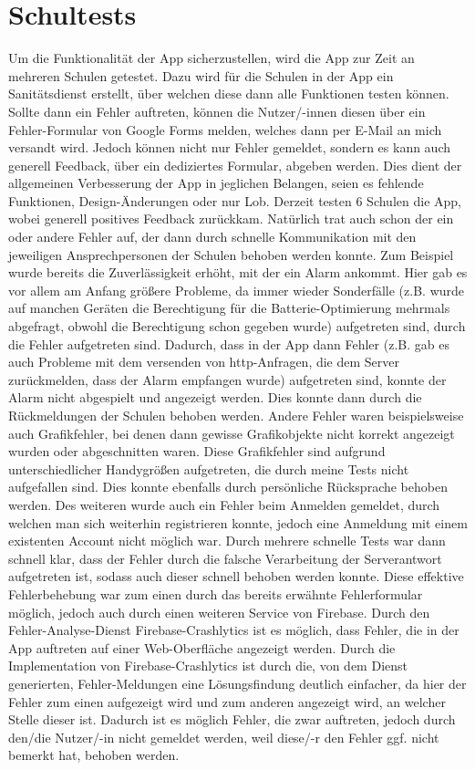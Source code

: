 \section{Schultests}
Um die Funktionalität der App sicherzustellen, wird die App zur Zeit an 
mehreren Schulen getestet. Dazu wird für die Schulen in der App ein Sanitätsdienst erstellt,
über welchen diese dann alle Funktionen testen können. Sollte dann ein Fehler
auftreten, können die Nutzer/-innen diesen über ein Fehler-Formular von Google Forms 
melden, welches dann per E-Mail an mich versandt wird. 
Jedoch können nicht nur Fehler gemeldet, sondern es kann auch generell Feedback, über ein
dediziertes Formular, abgeben werden. Dies dient der allgemeinen Verbesserung
der App in jeglichen Belangen, seien es fehlende Funktionen, Design-Änderungen
oder nur Lob. Derzeit testen 6 Schulen die App, wobei generell positives
Feedback zurückkam. Natürlich trat auch schon der ein oder andere Fehler 
auf, der dann durch schnelle Kommunikation mit den jeweiligen 
Ansprechpersonen der Schulen behoben werden konnte.
Zum Beispiel wurde bereits die Zuverlässigkeit erhöht, mit der ein Alarm 
ankommt. Hier gab es vor allem am Anfang größere Probleme, da immer wieder 
Sonderfälle (z.B. wurde auf manchen Geräten die Berechtigung für die Batterie-Optimierung
mehrmals abgefragt, obwohl die Berechtigung schon gegeben wurde) aufgetreten sind, durch 
die Fehler aufgetreten sind. Dadurch, dass in der App dann Fehler (z.B. gab es auch Probleme
mit dem versenden von http-Anfragen, die dem Server zurückmelden, dass der Alarm empfangen wurde) 
aufgetreten sind, konnte der Alarm nicht abgespielt und angezeigt werden. Dies konnte dann 
durch die Rückmeldungen der Schulen behoben werden. Andere Fehler waren beispielsweise 
auch Grafikfehler, bei denen dann gewisse Grafikobjekte nicht korrekt angezeigt wurden 
oder abgeschnitten waren. Diese Grafikfehler sind aufgrund unterschiedlicher Handygrößen aufgetreten,
die durch meine Tests nicht aufgefallen sind. Dies konnte ebenfalls durch persönliche Rücksprache behoben werden.
Des weiteren wurde auch ein Fehler beim Anmelden gemeldet, durch welchen
man sich weiterhin registrieren konnte, jedoch eine Anmeldung mit einem 
existenten Account nicht möglich war.
Durch mehrere schnelle Tests war dann schnell klar, dass der Fehler durch die 
falsche Verarbeitung der Serverantwort aufgetreten ist, sodass auch dieser 
schnell behoben werden konnte. 
Diese effektive Fehlerbehebung war zum einen durch das bereits erwähnte 
Fehlerformular möglich, jedoch auch durch einen weiteren Service von Firebase.
Durch den Fehler-Analyse-Dienst \glqq Firebase-Crashlytics\grqq{} ist es möglich, dass Fehler, die in der App 
auftreten auf einer Web-Oberfläche angezeigt werden. Durch die Implementation 
von Firebase-Crashlytics ist durch die, von dem Dienst generierten, Fehler-Meldungen eine Lösungsfindung 
deutlich einfacher, da hier der Fehler zum einen aufgezeigt wird und zum anderen
angezeigt wird, an welcher Stelle dieser ist. Dadurch ist es möglich Fehler, die zwar auftreten, jedoch durch den/die
Nutzer/-in nicht gemeldet werden, weil diese/-r den Fehler ggf. nicht bemerkt hat, behoben werden.